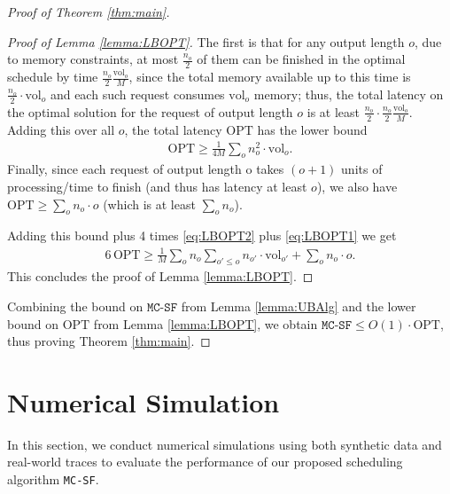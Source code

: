 \documentclass[11pt, a4paper]{article}
\theoremstyle{plain}
\theoremstyle{definition}
\theoremstyle{remark}
\newcommand{\OPT}{\text{OPT}}
\newcommand{\mcsdf}{\texttt{MC-SF}}
\newcommand{\vol}{\textrm{vol}}
\newcommand{\alg}{\mcsdf}
\begin{document}
\begin{proof}[Proof of Theorem \ref{thm:main}]
\begin{proof}[Proof of Lemma \ref{lemma:LBOPT}]
	The first is that for any output length $o$, due to memory constraints, at most $\frac{n_o}{2}$ of them can be finished in the optimal schedule by time $\frac{n_o}{2} \frac{\vol_o}{M}$, since the total memory available up to this time is $\frac{n_o}{2} \cdot \vol_o$ and each such request consumes $\vol_o$ memory; thus, the total latency on the optimal solution for the request of output length $o$ is at least $\frac{n_o}{2} \cdot \frac{n_o}{2} \frac{\vol_o}{M}$. Adding this over all $o$, the total latency $\OPT$ has the lower bound 
	\begin{align}
	\OPT \ge \frac{1}{4M} \sum_o n^2_o \cdot \vol_o.  \label{eq:LBOPT2}
	\end{align}	
	Finally, since each request of output length o takes $(o+1)$ units of processing/time to finish (and thus has latency at least $o$), we also have $\OPT \ge \sum_o n_o \cdot o$ (which is at least $\sum_o n_o$).
	
	Adding this bound plus 4 times \eqref{eq:LBOPT2} plus \eqref{eq:LBOPT1} we get 
	\begin{align}
	6\, \OPT \ge  \frac{1}{M} \sum_o n_o \sum_{o' \le o} n_{o'} \cdot \vol_{o'} + \sum_o n_o \cdot o.
	\end{align}	 
	This concludes the proof of Lemma \ref{lemma:LBOPT}.
\end{proof}


Combining the bound on $\alg$ from Lemma \ref{lemma:UBAlg} and the lower bound on $\OPT$ from Lemma \ref{lemma:LBOPT}, we obtain $\alg \le O(1) \cdot \OPT$, thus proving Theorem \ref{thm:main}.
\end{proof}






\section{Numerical Simulation} \label{sec:num}

In this section, we conduct numerical simulations using both synthetic data and real-world traces to evaluate the performance of our proposed scheduling algorithm \mcsdf. 
\end{document}
